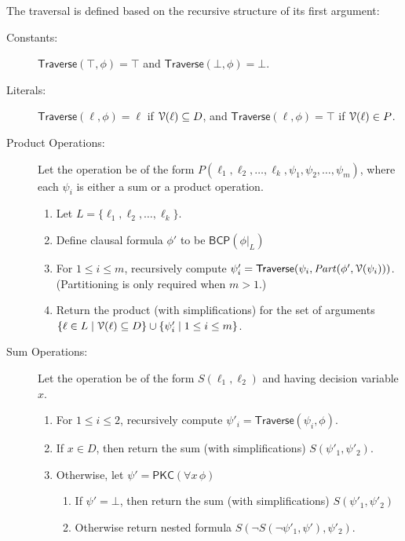 \documentclass[letterpaper,USenglish,cleveref, autoref, thm-restate]{lipics-v2021}
\newcommand{\tautology}{\top}
\newcommand{\nil}{\bot}
\newcommand{\lit}{\ell}
\newcommand{\dvarset}{D}
\newcommand{\pvarset}{P}
\newcommand{\dependencyset}{{\cal V}}
\newcommand{\simplify}[2]{#1|_{#2}}
\newcommand{\ureduce}[2]{\forall #2\, #1}
\newcommand{\partition}[2]{\mathit{Part}(#1, #2)}
\newcommand{\algo}[1]{\textsf{#1}}
\newcommand{\pkc}{\algo{PKC}}
\newcommand{\traverse}{\algo{Traverse}}
\newcommand{\bcp}{\algo{BCP}}
\begin{document}
The traversal is defined based on the recursive structure of its first argument:
\begin{description}
\item[Constants:]
  $\traverse(\tautology, \phi) = \tautology$ and 
  $\traverse(\nil, \phi) = \nil$.

\item[Literals:]
  $\traverse(\lit, \phi) = \lit$ if $\dependencyset(\lit) \subseteq \dvarset$, and $\traverse(\lit, \phi) = \tautology$ if $\dependencyset(\lit) \in \pvarset$.
\item[Product Operations:]
  Let the operation be of the form $P(\lit_1, \lit_2, \ldots, \lit_k, \psi_1, \psi_2, \ldots, \psi_m)$, where each $\psi_i$ is either a sum or a  product operation.
  \begin{enumerate}
  \item Let $L = \{\lit_1, \lit_2, \ldots, \lit_k\}$.
  \item Define clausal formula $\phi'$ to be $\bcp(\simplify{\phi}{L})$
  \item For $1 \leq i \leq m$, recursively compute $\psi'_i = \traverse(\psi_i, \partition{\phi'}{\dependencyset(\psi_i)})$.  (Partitioning is only required when $m > 1$.)
  \item Return the product (with simplifications) for the set of arguments $\{\lit \in L \mid  \dependencyset(\lit) \subseteq \dvarset\} \cup \{ \psi'_i \mid  1 \leq i \leq m \}$.
  \end{enumerate}
\item[Sum Operations:]
  Let the operation be of the form $S(\lit_1, \lit_2)$ and having decision variable $x$.
  \begin{enumerate}
  \item For $1 \leq i \leq 2$, recursively compute $\psi'_i = \traverse(\psi_i, \phi)$.
  \item If $x \in \dvarset$, then return the sum (with simplifications) $S(\psi'_1, \psi'_2)$.
  \item Otherwise, let $\psi' = \pkc(\ureduce{\phi}{x})$
    \begin{enumerate}
    \item If $\psi' = \nil$, then return the sum (with simplifications) $S(\psi'_1, \psi'_2)$
    \item Otherwise return nested formula $S(\neg S(\neg \psi'_1, \psi'), \psi'_2)$.
    \end{enumerate}
  \end{enumerate}
\end{description}
\end{document}
